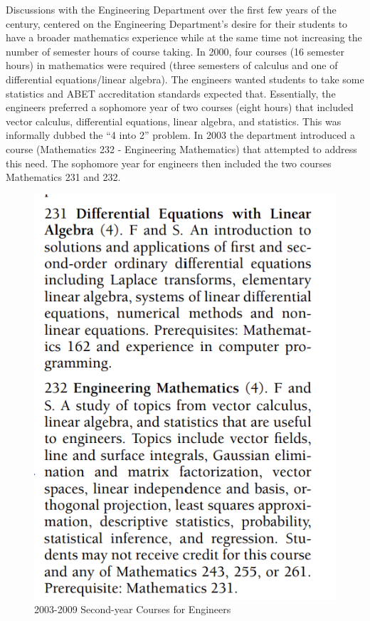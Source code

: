 \documentclass[
]{book}
\begin{document}
Discussions with the Engineering Department over the first few years of the century, centered on the Engineering Department's desire for their students to have a broader mathematics experience while at the same time not increasing the number of semester hours of course taking. In 2000, four courses (16 semester hours) in mathematics were required (three semesters of calculus and one of differential equations/linear algebra). The engineers wanted students to take some statistics and ABET accreditation standards expected that. Essentially, the engineers preferred a sophomore year of two courses (eight hours) that included vector calculus, differential equations, linear algebra, and statistics. This was informally dubbed the ``4 into 2'' problem. In 2003 the department introduced a course (Mathematics 232 - Engineering Mathematics) that attempted to address this need. The sophomore year for engineers then included the two courses Mathematics 231 and 232.

\begin{figure}

{\centering \includegraphics[width=6.67in]{images/M232} 

}

\caption{2003-2009 Second-year Courses for Engineers}\label{fig:M232}
\end{figure}
\end{document}
